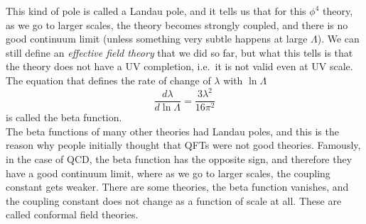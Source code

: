 \documentclass[11pt]{article}
\numberwithin{equation}{section}
\begin{document}
\begin{figure}[H]
    \centering 
\end{figure}

This kind of pole is called a Landau pole, and it tells us that for this \(\phi^4\) theory, as we go to larger scales, the theory becomes strongly coupled, and there is no good continuum limit (unless something very subtle happens at large \(\Lambda\)). We can still define an \textit{effective field theory} that we did so far, but what this tells is that the theory does not have a UV completion, i.e.\ it is not valid even at UV scale.\\

The equation that defines the rate of change of \(\lambda\) with \(\ln\Lambda\)
\begin{equation*}
    \frac{d\lambda}{d\ln\Lambda} = \frac{3\lambda^2}{16\pi^2}
\end{equation*}
is called the beta function. \\

The beta functions of many other theories had Landau poles, and this is the reason why people initially thought that QFTs were not good theories. Famously, in the case of QCD, the beta function has the opposite sign, and therefore they have a good continuum limit, where as we go to larger scales, the coupling constant gets weaker. There are some theories, the beta function vanishes, and the coupling constant does not change as a function of scale at all. These are called conformal field theories.
\end{document}
